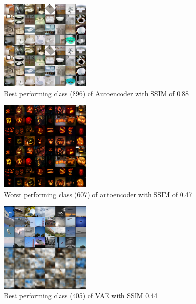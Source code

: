     \begin{figure}
        \centering
        \includegraphics[width=0.4\textwidth]{../../sample_images/evaluation/MAX_AE_IDX_896.png}
        \caption{Best performing class (896) of Autoencoder with SSIM of 0.88}
        \label{fig:imnet_best_perf_ae}
    \end{figure}

    \begin{figure}
        \centering
        \includegraphics[width=0.4\textwidth]{../../sample_images/evaluation/MIN_AE_IDX_607.png}
        \caption{Worst performing class (607) of autoencoder with SSIM of 0.47}
        \label{fig:imnet_worst_perf_ae}
    \end{figure}

    \begin{figure}
        \centering
        \includegraphics[width=0.4\textwidth]{../../sample_images/evaluation/MAX_VAE_IDX_405.png}
        \caption{Best performing class (405) of VAE with SSIM 0.44}
        \label{fig:imnet_best_perf2_vae}
    \end{figure}
    

